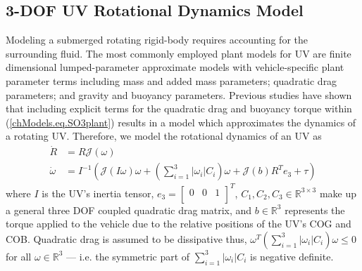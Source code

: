 \subsection{3-\acs{DOF} \acs{UV} Rotational Dynamics Model}
\label{chModels.sec.UVSO3plant}

Modeling a submerged rotating rigid-body requires accounting for the
surrounding fluid.
%
The most commonly employed plant models for \ac{UV} are
finite dimensional lumped-parameter approximate models with
vehicle-specific plant parameter terms including mass and added mass
parameters; quadratic drag parameters; and gravity and buoyancy
parameters.  
%
Previous studies have shown that including explicit terms
for the quadratic drag and buoyancy torque within
(\ref{chModels.eq.SO3plant}) results in a model which approximates
the dynamics of a rotating \ac{UV}\cite{martinID_ICRA13}.
Therefore, we model the rotational dynamics of an \ac{UV} as
%
\begin{align} \label{chModels.eq.UVSO3plant}
\dot{R}&=R\mathcal{J}(\omega)
\nonumber \\
  \dot{\omega}&=I^{-1}\left(\mathcal{J}(I\omega)\omega+\left(\sum_{i=1}^3 |\omega_i|C_i
    \right)\omega+\mathcal{J}(b)R^T e_3+\tau\right) 
\end{align}
%
\noindent where $I$ is the \ac{UV}'s inertia tensor,
$e_3=\left[ \begin{array}{ccc} 0& 0& 1\\ \end{array}\right]^T$,
$C_1,C_2,C_3\in \mathbb{R}^{3\times 3}$ make up a general three \ac{DOF}
coupled quadratic drag matrix, and $b\in\mathbb{R}^3$ represents the
torque applied to the vehicle due to the relative positions of the
\ac{UV}'s \ac{COG} and \ac{COB}.
Quadratic drag is assumed to be dissipative
thus, $\omega^T \left(\sum_{i=1}^3
  |\omega_i|C_i\right)\omega\leq 0$ for all $\omega\in\mathbb{R}^3$
--- i.e. the symmetric part of $\sum_{i=1}^3 |\omega_i|C_i$ is negative
definite.



